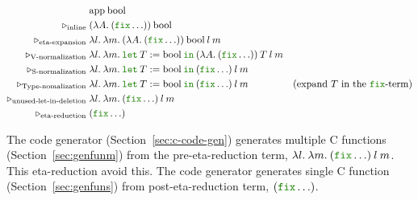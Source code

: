 \documentclass[a4paper,fleqn]{article}
\newcommand{\kwlet}{\mbox{\color{mygreen}\ttfamily let}}
\newcommand{\kwin}{\mbox{\color{mygreen}\ttfamily in}}
\newcommand{\kwfix}{\mbox{\color{mygreen}\ttfamily fix}}
\newcommand{\lam}[2]{\lambda #1.\:#2}
\newcommand{\letin}[3]{\kwlet\:#1:=#2\:\kwin\:#3}
\newcommand{\secref}[1]{Section~\ref{#1}}
\newcommand{\reltri}{\mathrel{\triangleright}}
\begin{document}
\begin{align*}
  & \textrm{app}\:\textrm{bool} \\
  \reltri_\textrm{inline}\; & (\lam{A}{(\kwfix \ldots)})\:\textrm{bool} \\
  \reltri_\textrm{eta-expansion}\; & \lam{l}{\lam{m}{(\lam{A}{(\kwfix \ldots)})\:\textrm{bool}\:l\:m}} \\
  \reltri_\textrm{V-normalization}\; & \lam{l}{\lam{m}{\letin{T}{\textrm{bool}}{(\lam{A}{(\kwfix \ldots)})\:T\:l\:m}}} \\
  \reltri_\textrm{S-normalization}\; & \lam{l}{\lam{m}{\letin{T}{\textrm{bool}}{(\kwfix \ldots)\:l\:m}}} \\
  \reltri_\textrm{Type-nomalization}\; & \lam{l}{\lam{m}{\letin{T}{\textrm{bool}}{(\kwfix \ldots)\:l\:m}}} & \textrm{(expand $T$ in the \kwfix-term)} \\
  \reltri_\textrm{unused-let-in-deletion}\; & \lam{l}{\lam{m}{(\kwfix \ldots)\:l\:m}} \\
  \reltri_\textrm{eta-reduction}\; & (\kwfix \ldots) \\
\end{align*}

The code generator (\secref{sec:c-code-gen}) generates multiple C functions (\secref{sec:genfunm}) from the pre-eta-reduction term, $\lam{l}{\lam{m}{(\kwfix \ldots)\:l\:m}}$.
This eta-reduction avoid this.
The code generator generates single C function (\secref{sec:genfuns}) from post-eta-reduction term, $(\kwfix \ldots)$.
\end{document}
